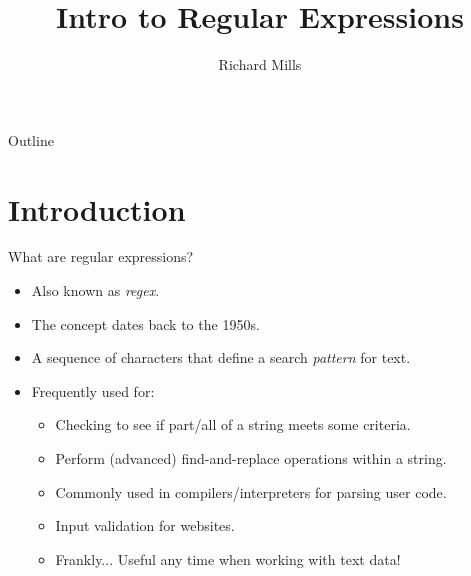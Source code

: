 \documentclass[
	usenames,
	dvipsnames,
	handout
] {beamer}
\title{Intro to Regular Expressions}
\author{Richard Mills}
\date{}
\begin{document}
\maketitle

\begin{frame}{Outline}
	\tableofcontents
\end{frame}
				
\section{Introduction}
\begin{frame}{What are regular expressions?}
	\begin{itemize}[label=\textbullet]
		\item Also known as \textit{regex}.
		      \pause
		\item The concept dates back to the 1950s.
			\pause
		\item A sequence of characters that define a search \textit{pattern} for text.
		      \pause
		\item Frequently used for:
		      	\begin{itemize}[label=\textendash]
			      	\item Checking to see if part/all of a string meets some criteria.
			      	      \pause
			      	\item Perform (advanced) find-and-replace operations within a string.
			      	      \pause
			      	\item Commonly used in compilers/interpreters for parsing user code.
			      	      \pause
			      	\item Input validation for websites.
			      		\pause
				\item Frankly... Useful any time when working with text data!
		      	\end{itemize}
	\end{itemize}
\end{frame}
\end{document}
